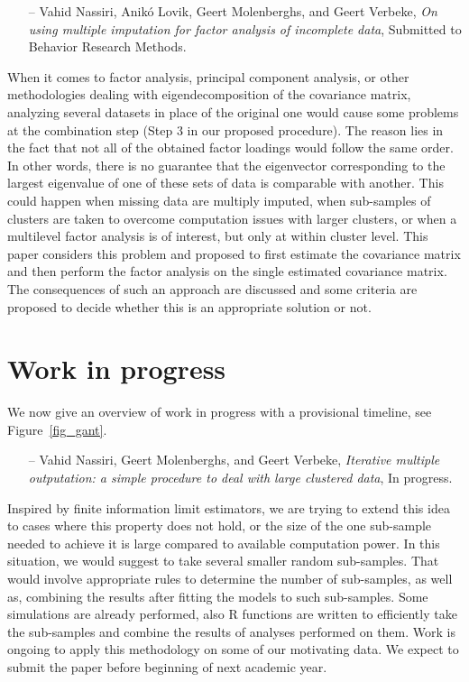 \documentclass[14pt]{article}
\begin{document}
\begin{itemize}
\item[--]{\textsf{Vahid Nassiri, Anik\'{o} Lovik, Geert Molenberghs, and Geert Verbeke}}, {\it On using multiple imputation for factor analysis of incomplete data}, Submitted to Behavior Research Methods.
\end{itemize}
When it comes to factor analysis, principal component analysis, or other methodologies dealing with  eigendecomposition of the covariance matrix, analyzing several datasets in place of the original one would cause some problems at the combination step (Step 3 in our proposed procedure). The reason lies in the fact that not all of the obtained factor loadings would follow the same order. In other words, there is no guarantee that the eigenvector corresponding to the largest eigenvalue of one of these sets of data is comparable with another. This could happen when missing data are multiply imputed, when sub-samples of clusters are taken to overcome computation issues with larger clusters, or when a multilevel factor analysis is of interest, but only at within cluster level. This paper considers this problem and proposed to first estimate the covariance matrix and then perform the factor analysis on the single estimated covariance matrix. The consequences of such an approach are discussed and some criteria are proposed to decide whether this is an appropriate solution or not.



\section{Work in progress}
\label{sec_progress}

We now give an overview of work in progress with a provisional timeline, see Figure~\ref{fig_gant}.

\begin{itemize}
\item[--]{\textsf{Vahid Nassiri, Geert Molenberghs, and Geert Verbeke}}, {\it Iterative multiple outputation: a simple procedure to deal with large clustered data}, In progress.
\end{itemize}
Inspired by finite information limit estimators, we are trying to extend this idea to cases where this property does not hold, or the size of the one sub-sample needed to achieve it is large compared to available computation power. In this situation, we would suggest to take several smaller random sub-samples. That would involve appropriate rules to determine the number of sub-samples, as well as, combining the results after fitting the models to such sub-samples. Some simulations are already performed, also \textsf{R} functions are written to efficiently take the sub-samples and combine the results of analyses performed on them. Work is ongoing to apply this methodology on some of our motivating data. We expect to submit the paper before beginning of next academic year.
\end{document}

